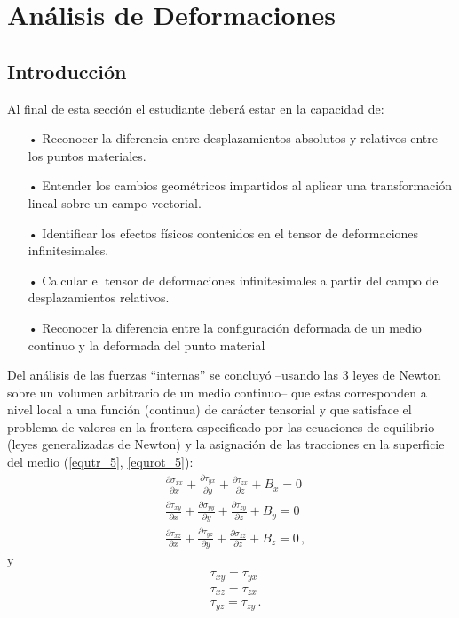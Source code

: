 \documentclass[../notas medios.tex]{subfiles}
\begin{document}
\chapter{Análisis de Deformaciones}

\graphicspath{{img/Cap5/}}
\section{Introducción}

Al final de esta sección el estudiante deberá estar en la capacidad de:

\begin{itemize}
\item[•] Reconocer la diferencia entre desplazamientos absolutos y relativos entre los puntos materiales.
\item[•] Entender los cambios geométricos impartidos al aplicar una transformación lineal sobre un campo vectorial.
\item[•] Identificar los efectos físicos contenidos en el tensor de deformaciones infinitesimales.
\item[•] Calcular el tensor de deformaciones infinitesimales a partir del campo de desplazamientos relativos. 
\item[•] Reconocer la diferencia entre la configuración deformada de un medio continuo y la deformada del punto material
\end{itemize}

Del análisis de las fuerzas ``internas'' se concluyó --usando las 3 leyes de Newton sobre un volumen arbitrario de un medio continuo-- que estas corresponden a nivel local a una función (continua) de carácter tensorial y que satisface el problema de valores en la frontera especificado por las ecuaciones de equilibrio (leyes generalizadas de Newton) y la asignación de las tracciones en la superficie del medio (\cref{equtr_5}, \cref{equrot_5}):
\begin{equation} \label{equtr_5}
\begin{split}
& \frac{\partial \sigma_{xx}}{\partial x} + \frac{\partial \tau_{yx}}{\partial y} + \frac{\partial \tau_{zx}}{\partial z} + B_x = 0 \\
& \frac{\partial \tau_{xy}}{\partial x} + \frac{\partial \sigma_{yy}}{\partial y} + \frac{\partial \tau_{zy}}{\partial z} + B_y = 0 \\
& \frac{\partial \tau_{xz}}{\partial x} + \frac{\partial \tau_{yz}}{\partial y} + \frac{\partial \sigma_{zz}}{\partial z} + B_z = 0\, ,
\end{split}
\end{equation}
y
\begin{equation} \label{equrot_5}
\begin{split}
& \tau_{xy} = \tau_{yx} \\
& \tau_{xz} = \tau_{zx} \\
& \tau_{yz} = \tau_{zy}\, .
\end{split}
\end{equation}
\end{document}
